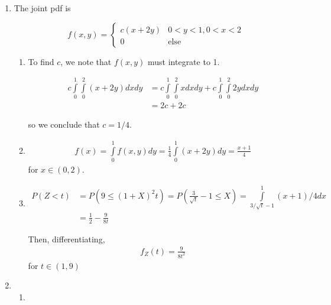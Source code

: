 \documentclass[12pt]{article}
\begin{document}
\begin{enumerate}
\item The joint pdf is

$$f(x,y) = \begin{cases} 
c(x + 2y) & 0 < y < 1, 0 < x < 2 \\
0 & \text{else}
\end{cases}$$

\begin{enumerate}

\item To find $c$, we note that $f(x,y)$ must integrate to 1.

\begin{align*}
c \int \limits_0^1 \int \limits_0^2 (x + 2y) dx dy &= c \int \limits_0^1 \int \limits_0^2 x dx dy + c \int \limits_0^1 \int \limits_0^2 2y dx dy \\
&= 2c + 2c
\end{align*}

so we conclude that $c= 1/4$.

\item 

\begin{align*}
f(x) = \int \limits_0^1 f(x,y) dy = \frac{1}{4} \int \limits_0^1 (x + 2y) dy = \frac{x + 1}{4}
\end{align*}
for $x \in (0, 2)$.

\item 

\begin{align*}
P(Z < t) &= P(9 \leq (1 + X)^2t) = P(\frac{3}{\sqrt{t}} - 1 \leq X) = \int \limits_{3/\sqrt{t} - 1}^1 (x + 1)/4 dx \\
&= \frac{1}{2} - \frac{9}{8t}
\end{align*}

Then, differentiating,
\begin{align*}
f_Z(t) = \frac{9}{8 t^2}
\end{align*}
for $t \in (1, 9)$

\end{enumerate}

\item 

\begin{enumerate}
\item


\end{enumerate}
\end{enumerate}
\end{document}
